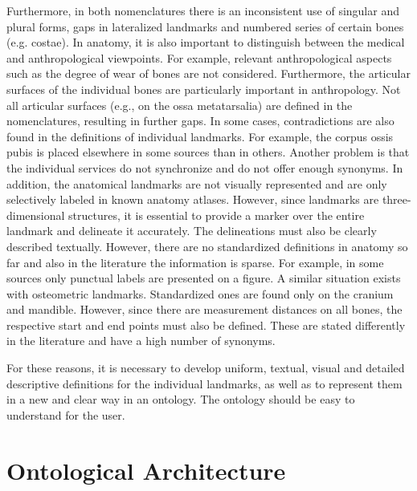 \documentclass[sw]{iosart2x}
\begin{document}
Furthermore, in both nomenclatures there is an inconsistent use of singular and plural forms, gaps in lateralized landmarks and numbered series of certain bones (e.g. costae).
In anatomy, it is also important to distinguish between the medical and anthropological viewpoints.
For example, relevant anthropological aspects such as the degree of wear of bones are not considered.
Furthermore, the articular surfaces of the individual bones are particularly important in anthropology.
Not all articular surfaces (e.g., on the ossa metatarsalia) are defined in the nomenclatures, resulting in further gaps.
In some cases, contradictions are also found in the definitions of individual landmarks.
For example, the corpus ossis pubis is placed elsewhere in some sources than in others.
Another problem is that the individual services do not synchronize and do not offer enough synonyms. %
In addition, the anatomical landmarks are not visually represented and are only selectively labeled in known anatomy atlases.
However, since landmarks are three-dimensional structures, it is essential to provide a marker over the entire landmark and delineate it accurately.
The delineations must also be clearly described textually.
However, there are no standardized definitions in anatomy so far and also in the literature the information is sparse.
For example, in some sources only punctual labels are presented on a figure.
A similar situation exists with osteometric landmarks.
Standardized ones are found only on the cranium and mandible.
However, since there are measurement distances on all bones, the respective start and end points must also be defined.
These are stated differently in the literature and have a high number of synonyms.

For these reasons, it is necessary to develop uniform, textual, visual and detailed descriptive definitions for the individual landmarks, as well as to represent them in a new and clear way in an ontology.
The ontology should be easy to understand for the user.



\section{Ontological Architecture}\label{sec:architecture}
\end{document}
